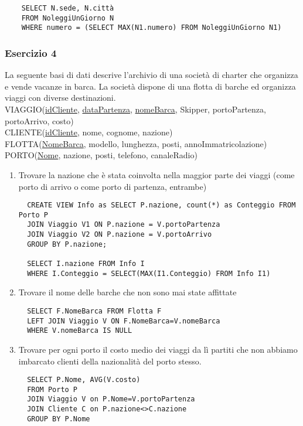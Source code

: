 \documentclass[a4paper]{article}
\begin{document}
\begin{enumerate}
\begin{enumerate}
\begin{verbatim}
    SELECT N.sede, N.città
    FROM NoleggiUnGiorno N
    WHERE numero = (SELECT MAX(N1.numero) FROM NoleggiUnGiorno N1)
  \end{verbatim}
\end{enumerate}

\subsubsection{Esercizio 4}
La seguente basi di dati descrive l'archivio di una società di charter che organizza e vende vacanze in barca. La società dispone di una flotta di barche ed organizza viaggi con diverse destinazioni.\medskip\\
VIAGGIO(\underline{idCliente}, \underline{dataPartenza}, \underline{nomeBarca}, Skipper, portoPartenza, portoArrivo, costo)\\
CLIENTE(\underline{idCliente}, nome, cognome, nazione)\\
FLOTTA(\underline{NomeBarca}, modello, lunghezza, posti, annoImmatricolazione)\\
PORTO(\underline{Nome}, nazione, posti, telefono, canaleRadio)
\begin{enumerate}
\item Trovare la nazione che è stata coinvolta nella maggior parte dei viaggi (come porto di arrivo o come porto di partenza, entrambe)
  \begin{verbatim}
  CREATE VIEW Info as SELECT P.nazione, count(*) as Conteggio FROM Porto P
  JOIN Viaggio V1 ON P.nazione = V.portoPartenza
  JOIN Viaggio V2 ON P.nazione = V.portoArrivo
  GROUP BY P.nazione;

  SELECT I.nazione FROM Info I
  WHERE I.Conteggio = SELECT(MAX(I1.Conteggio) FROM Info I1)
  \end{verbatim}
\item Trovare il nome delle barche che non sono mai state affittate
  \begin{verbatim}
  SELECT F.NomeBarca FROM Flotta F
  LEFT JOIN Viaggio V ON F.NomeBarca=V.nomeBarca
  WHERE V.nomeBarca IS NULL
  \end{verbatim}
\item Trovare per ogni porto il costo medio dei viaggi da lì partiti che non abbiamo imbarcato clienti della nazionalità del porto stesso.
  \begin{verbatim}
  SELECT P.Nome, AVG(V.costo)
  FROM Porto P
  JOIN Viaggio V on P.Nome=V.portoPartenza
  JOIN Cliente C on P.nazione<>C.nazione
  GROUP BY P.Nome
  \end{verbatim}
\end{enumerate}


\end{enumerate}
\end{document}
